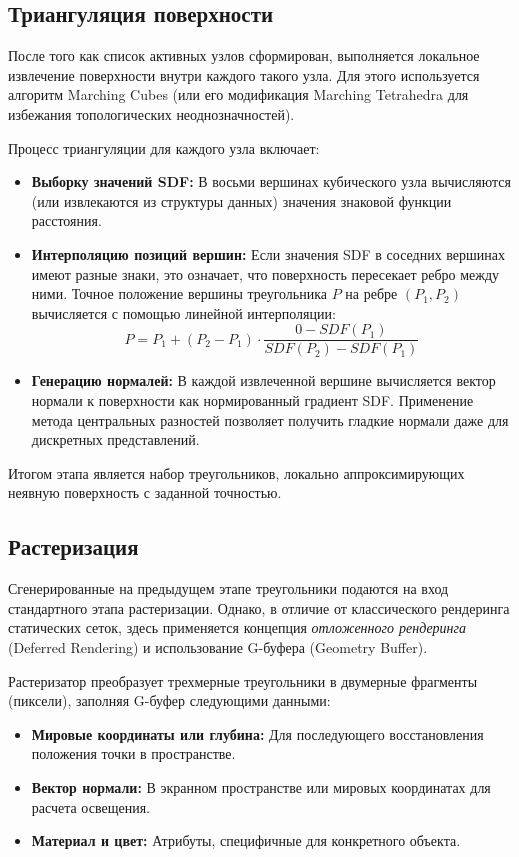 \subsection{Триангуляция поверхности}

После того как список активных узлов сформирован, выполняется локальное извлечение поверхности внутри каждого такого узла. Для этого используется алгоритм Marching Cubes (или его модификация Marching Tetrahedra для избежания топологических неоднозначностей).

Процесс триангуляции для каждого узла включает:
\begin{itemize}
    \item \textbf{Выборку значений SDF:} В восьми вершинах кубического узла вычисляются (или извлекаются из структуры данных) значения знаковой функции расстояния.
    \item \textbf{Интерполяцию позиций вершин:} Если значения SDF в соседних вершинах имеют разные знаки, это означает, что поверхность пересекает ребро между ними. Точное положение вершины треугольника $P$ на ребре $(P_1, P_2)$ вычисляется с помощью линейной интерполяции:
    \begin{equation}
        P = P_1 + (P_2 - P_1) \cdot \frac{0 - SDF(P_1)}{SDF(P_2) - SDF(P_1)}
    \end{equation}
    \item \textbf{Генерацию нормалей:} В каждой извлеченной вершине вычисляется вектор нормали к поверхности как нормированный градиент SDF. Применение метода центральных разностей позволяет получить гладкие нормали даже для дискретных представлений.
\end{itemize}

Итогом этапа является набор треугольников, локально аппроксимирующих неявную поверхность с заданной точностью.

\subsection{Растеризация}

Сгенерированные на предыдущем этапе треугольники подаются на вход стандартного этапа растеризации. Однако, в отличие от классического рендеринга статических сеток, здесь применяется концепция \textit{отложенного рендеринга} (Deferred Rendering) и использование G-буфера (Geometry Buffer).

Растеризатор преобразует трехмерные треугольники в двумерные фрагменты (пиксели), заполняя G-буфер следующими данными:
\begin{itemize}
    \item \textbf{Мировые координаты или глубина:} Для последующего восстановления положения точки в пространстве.
    \item \textbf{Вектор нормали:} В экранном пространстве или мировых координатах для расчета освещения.
    \item \textbf{Материал и цвет:} Атрибуты, специфичные для конкретного объекта.
\end{itemize}

